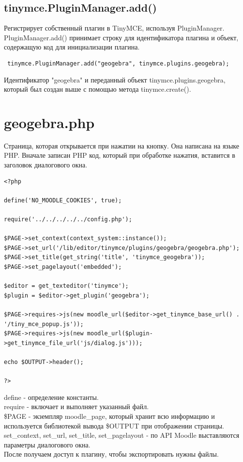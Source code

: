 \documentclass[14pt,Diplom]{diplomwork}
\begin{document}
\subsection{tinymce.PluginManager.add()}
 Регистрирует собственный плагин в TinyMCE, используя PluginManager. PluginManager.add() принимает строку для идентификатора плагина и объект, содержащую код для инициализации плагина.
 \begin{verbatim}
 tinymce.PluginManager.add("geogebra", tinymce.plugins.geogebra);
 \end{verbatim}
 Идентификатор "geogebra" и переданный объект tinymce.plugins.geogebra, который был создан выше с помощью метода tinymce.create().
 
\section{geogebra.php}
Страница, которая открывается при нажатии на кнопку. Она написана на языке PHP. Вначале записан PHP код, который при обработке нажатия, вставится в заголовок диалогового окна.

\begin{verbatim}
<?php

define('NO_MOODLE_COOKIES', true);

require('../../../../../config.php');

$PAGE->set_context(context_system::instance());
$PAGE->set_url('/lib/editor/tinymce/plugins/geogebra/geogebra.php');
$PAGE->set_title(get_string('title', 'tinymce_geogebra'));
$PAGE->set_pagelayout('embedded');

$editor = get_texteditor('tinymce');
$plugin = $editor->get_plugin('geogebra');

$PAGE->requires->js(new moodle_url($editor->get_tinymce_base_url() . '/tiny_mce_popup.js'));
$PAGE->requires->js(new moodle_url($plugin->get_tinymce_file_url('js/dialog.js')));

echo $OUTPUT->header();

?>
\end{verbatim}
define - определение константы.\\
require - включает и выполняет указанный файл.\\
\$PAGE - экземпляр moodle\_page, который хранит всю информацию и используется библиотекой вывода \$OUTPUT при отображении страницы.\\
set\_context, set\_url, set\_title, set\_pagelayout - по API Moodle выставляются параметры диалогового окна.\\
После получаем доступ к плагину, чтобы экспортировать нужны файлы.
\end{document}
